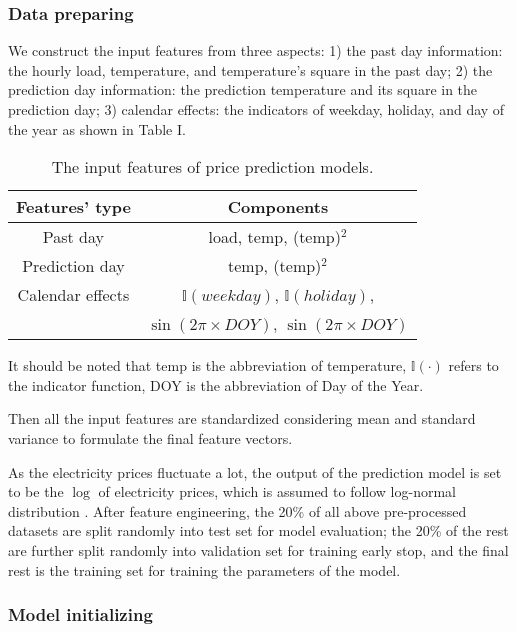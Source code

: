 \documentclass[journal]{IEEEtran}
\begin{document}
\subsubsection{Data preparing}
We construct the input features from three aspects: 1) the past day information: the hourly load, temperature, and temperature's square in the past day; 2) the prediction day information: the prediction temperature and its square in the prediction day; 3) calendar effects: the indicators of weekday, holiday, and day of the year as shown in Table I.
\begin{table}[ht]
  \renewcommand{\arraystretch}{1.3}
  \centering
  \label{input_features}
  \caption{The input features of price prediction models.}
  \begin{tabular}{cc}
    \hline
    Features' type & Components \\
    \hline
    Past day &  load, temp, (temp)$^2$ \\
    Prediction day & temp, (temp)$^2$ \\
    Calendar effects & $\mathbb{I}(weekday)$, $\mathbb{I}(holiday)$, \\ &
    $\sin(2 \pi \times DOY)$, $\sin(2 \pi \times DOY)$ \\
    \hline
  \end{tabular}
  \vspace{1ex}

  {\raggedright It should be noted that temp is the abbreviation of temperature, $\mathbb{I}(\cdot)$ refers to the indicator function, DOY is the abbreviation of Day of the Year.\par}
\end{table}

Then all the input features are standardized considering mean and standard variance to formulate the final feature vectors.

As the electricity prices fluctuate a lot, the output of the prediction model is set to be the $\log$ of electricity prices, which is assumed to follow log-normal distribution \cite{Donti2017}.   After feature engineering, the 20\% of all above pre-processed datasets are split randomly into test set for model evaluation; the 20\% of the rest are further split randomly into validation set for training early stop, and the final rest is the training set for training the parameters of the model. 

\subsubsection{Model initializing}
\end{document}
